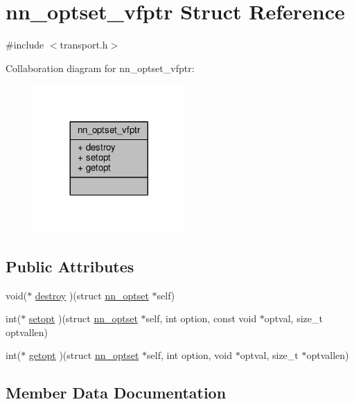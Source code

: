 \hypertarget{structnn__optset__vfptr}{}\section{nn\+\_\+optset\+\_\+vfptr Struct Reference}
\label{structnn__optset__vfptr}


{\ttfamily \#include $<$transport.\+h$>$}



Collaboration diagram for nn\+\_\+optset\+\_\+vfptr\+:\nopagebreak
\begin{figure}[H]
\begin{center}
\leavevmode
\includegraphics[width=164pt]{structnn__optset__vfptr__coll__graph}
\end{center}
\end{figure}
\subsection*{Public Attributes}
\begin{DoxyCompactItemize}
\item 
void($\ast$ \hyperlink{structnn__optset__vfptr_a74db5716dbfea0adbf69448f26804cc0}{destroy} )(struct \hyperlink{structnn__optset}{nn\+\_\+optset} $\ast$self)
\item 
int($\ast$ \hyperlink{structnn__optset__vfptr_a5a978c6140bb775abc02fcdf9456b60a}{setopt} )(struct \hyperlink{structnn__optset}{nn\+\_\+optset} $\ast$self, int option, const void $\ast$optval, size\+\_\+t optvallen)
\item 
int($\ast$ \hyperlink{structnn__optset__vfptr_a1e222a6d339ed4c930ab046bb61d77a0}{getopt} )(struct \hyperlink{structnn__optset}{nn\+\_\+optset} $\ast$self, int option, void $\ast$optval, size\+\_\+t $\ast$optvallen)
\end{DoxyCompactItemize}


\subsection{Member Data Documentation}
